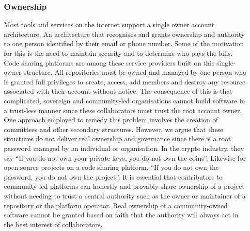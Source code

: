\subsubsection{Ownership}
Most tools and services on the internet support a single owner account architecture. An architecture that recognises and grants ownership and authority to one person identified by their email or phone number. Some of the motivation for this is the need to maintain security and to determine who pays the bills. Code sharing platforms are among these service providers built on this single-owner structure. All repositories must be owned and managed by one person who is granted full privileges to create, access, add members and destroy any resource associated with their account without notice.
The consequence of this is that complicated, sovereign and community-led organisations cannot build software in a trust-less manner since these collaborators must trust the root account owner. One approach employed to remedy this problem involves the creation of committees and other secondary structures. However, we argue that these structures do not deliver real ownership and governance since there is a root password managed by an individual or organisation. In the crypto industry, they say “If you do not own your private keys, you do not own the coins”. Likewise for open source projects on a code sharing platform, “If you do not own the password, you do not own the project”. It is essential that contributors to community-led platforms can honestly and provably share ownership of a project without needing to trust a central authority such as the owner or maintainer of a repository or the platform operator. Real ownership of a community-owned software cannot be granted based on faith that the authority will always act in the best interest of collaborators.

